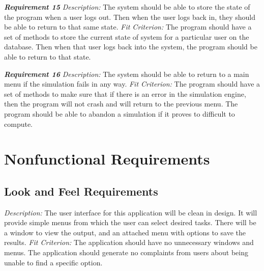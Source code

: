 \documentclass[12pt, titlepage]{article}
\begin{document}
\noindent\textbf{\textit{Requirement 15}}\newline
\textit{Description:}\newline
The system should be able to store the state of the program when a user logs out. Then when the user logs back in, they should be able to return to that same state.
\newline\newline
\textit{Fit Criterion:}\newline 
The program should have a set of methods to store the current state of system for a particular user on the database. Then when that user logs back into the system, the program should be able to return to that state.\newline

\noindent\textbf{\textit{Requirement 16}}\newline
\textit{Description:}\newline
The system should be able to return to a main menu if the simulation fails in any way.
\newline\newline
\textit{Fit Criterion:}\newline 
The program should have a set of methods to make sure that if there is an error in the simulation engine, then the program will not crash and will return to the previous menu. The program should be able to abandon a simulation if it proves to difficult to compute. \newline

\section{Nonfunctional Requirements}
\subsection{Look and Feel Requirements}
\textit{Description:}\newline
The user interface for this application will be clean in design. It will provide simple menus from which the user can select desired tasks. There will be a window to view the output, and an attached menu with options to save the results. 
\newline \newline 
\textit{Fit Criterion:}\newline 
The application should have no unnecessary windows and menus.
The application should generate no complaints from users about being unable to find a specific option.
\end{document}
